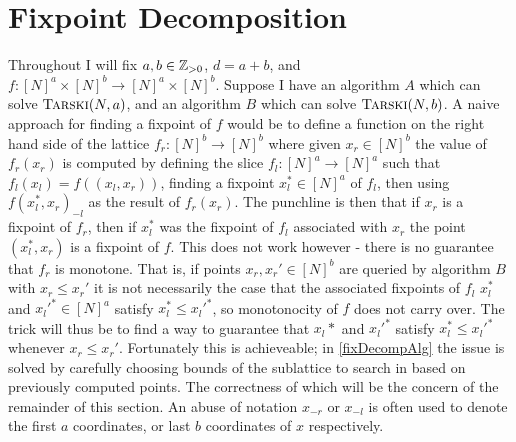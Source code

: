 \section{Fixpoint Decomposition} \label{fixDecompChapter}
Throughout I will fix $a, b \in \mathbb{Z}_{> 0}$,
$d = a + b$, and $f : [N]^a \times [N]^b \to [N]^a \times [N]^b$.
Suppose I have an algorithm $A$ which can solve $\textsc{Tarski}(N, a)$,
and an algorithm $B$ which can solve $\textsc{Tarski}(N, b)$. A naive approach 
for finding a fixpoint of $f$ would be to define a
function on the right hand side of the lattice
$f_r : [N]^b \to [N]^b$ where given $x_r \in [N]^b$ the value of 
$f_r(x_r)$
is computed by defining the slice $f_l : [N]^a \to [N]^a$
such that $f_l(x_l) = f((x_l, x_r))$, finding a fixpoint $x_l^* \in [N]^a$
of $f_l$, then using $f(x_l^*, x_r)_{-l}$ as the result of $f_r(x_r)$.
The punchline is then that if $x_r$ is a fixpoint of $f_r$, then if
$x_l^*$ was the fixpoint of $f_l$ associated with $x_r$ the point
$(x_l^*, x_r)$ is a fixpoint of $f$. This does not work however -
there is no guarantee that $f_r$ is monotone. That is,
if points $x_r, x_r' \in [N]^b$ are queried by algorithm $B$
with $x_r \leq x_r'$ it is not necessarily the case that the associated
fixpoints of $f_l$ $x_l^*$ and $x_l'^* \in [N]^a$ satisfy $x_l^* \leq x_l'^*$, so
monotonocity of $f$ does not carry over. The trick will thus be
to find a way to guarantee that $x_l*$ and $x_l'^*$ satisfy 
$x_l^* \leq x_l'^*$ whenever $x_r \leq x_r'$. Fortunately
this is achieveable; in \cref{fixDecompAlg} the issue is solved
by carefully choosing bounds of the sublattice to search in based
on previously computed points. The correctness of which will be
the concern of the remainder of this section.
An abuse of notation $x_{-r}$ or $x_{-l}$ is often used to denote
the first $a$ coordinates, or last $b$ coordinates of $x$ respectively.
